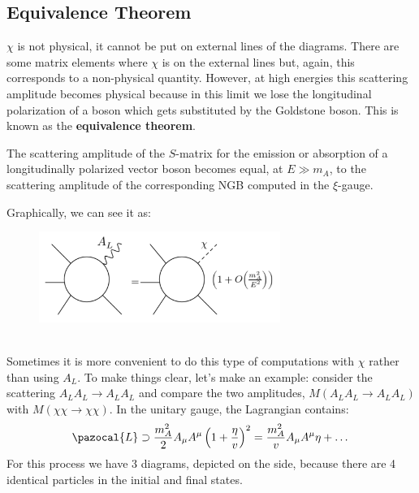 \documentclass[../main.tex]{subfiles}
\begin{document}
\subsection{Equivalence Theorem}
$\chi$ is not physical, it cannot be put on external lines of the diagrams. There are some matrix elements where $\chi$ is on the external lines but, again, this corresponds to a non-physical quantity. However, at high energies this scattering amplitude becomes physical because in this limit we lose the longitudinal polarization of a boson which gets substituted by the Goldstone boson. This is known as the \textbf{equivalence theorem}.
\begin{theorem}
The scattering amplitude of the $S$-matrix for the emission or absorption of a longitudinally polarized vector boson becomes equal, at $E\gg m_A$, to the scattering amplitude of the corresponding NGB computed in the $\xi$-gauge.
\end{theorem}
Graphically, we can see it as:
\begin{figure}[h]
    \centering
    \includegraphics[width=0.7\textwidth]{Images/eqthm.pdf}
    \caption*{}
    \label{fig:my_label}
\end{figure}\\
Sometimes it is more convenient to do this type of computations with $\chi$ rather than using $A_L$. To make things clear, let's make an example: consider the scattering $A_LA_L\to A_LA_L$ and compare the two amplitudes, $M(A_LA_L\to A_LA_L)$ with $M(\chi\chi\to\chi\chi)$.   
In the unitary gauge, the Lagrangian contains:
\[
\pazocal{L}\supset\frac{m_A^2}{2}A_\mu A^\mu\left(1+\frac{\eta}{v}\right)^2=\frac{m_A^2}{v}A_\mu A^\mu\eta+\dots
\]
For this process we have 3 diagrams, depicted on the side, because there are 4 identical particles in the initial and final states.
\end{document}
